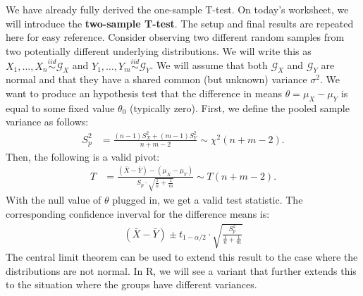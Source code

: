 \documentclass{tufte-handout}
\newcommand{\iid}{\stackrel{iid}{\sim}}
\begin{document}
\vspace*{36pt}

\noindent
We have already fully derived the one-sample T-test. On today's worksheet,
we will introduce the \textbf{two-sample T-test}. The setup and
final results are repeated here for easy reference. Consider observing
two different random samples from two potentially different underlying
distributions. We will write this as $X_1, \ldots, X_n \iid \mathcal{G}_X$ and
$Y_1, \ldots, Y_m \iid \mathcal{G}_Y$. We will assume that both
$\mathcal{G}_X$ and $\mathcal{G}_Y$ are normal and that they have a shared
common (but unknown) variance $\sigma^2$. We want to produce an hypothesis
test that the difference in means $\theta = \mu_X - \mu_Y$ is equal to some
fixed value $\theta_0$ (typically zero). First, we define the pooled sample
variance as follows: 
\begin{align*}
S_p^2 &= \frac{(n-1) S_X^2 + (m - 1) S_Y^2}{n + m - 2} \sim \chi^2(n + m - 2).
\end{align*}
Then, the following is a valid pivot:
\begin{align*}
T &= \frac{(\bar{X} - \bar{Y}) - (\mu_X - \mu_Y)}{S_p \cdot \sqrt{\frac{1}{n} + \frac{1}{m}}} \sim T(n + m - 2).
\end{align*}
With the null value of $\theta$ plugged in, we get a valid test statistic.
The corresponding confidence inverval for the difference means is:
\begin{align*}
(\bar{X} - \bar{Y}) \pm t_{1 - \alpha/2} \cdot \sqrt{\frac{S_p^2}{\frac{1}{n} + \frac{1}{m}}}
\end{align*}
The central limit theorem can be used to extend this result to the case where
the distributions are not normal. In R, we will see a variant that further extends
this to the situation where the groups have different variances.
\end{document}
